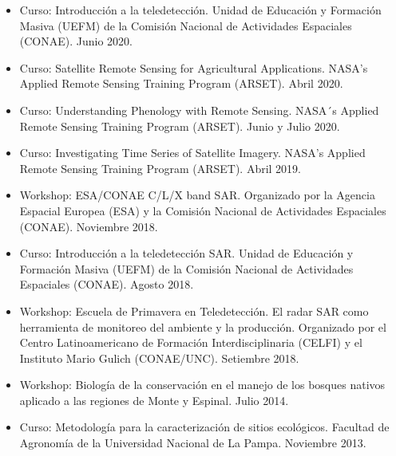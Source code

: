 \documentclass[9.5pt,a4paper,ragged2e, normalphoto]{altacv}
\begin{document}
\begin{itemize}
\item {Curso: Introducción a la teledetección. Unidad de Educación y Formación Masiva (UEFM) de la Comisión Nacional de Actividades Espaciales (CONAE). Junio 2020.}

\item {Curso: Satellite Remote Sensing for Agricultural Applications. NASA’s Applied Remote Sensing Training Program (ARSET). Abril 2020.}


\item {Curso: Understanding Phenology with Remote Sensing. NASA´s Applied Remote Sensing Training Program (ARSET). Junio y Julio 2020.}

\item {Curso: Investigating Time Series of Satellite Imagery. NASA’s Applied Remote Sensing Training Program (ARSET). Abril 2019.}

\item {Workshop: ESA/CONAE C/L/X band SAR. Organizado por la Agencia Espacial Europea (ESA) y la Comisión Nacional de Actividades Espaciales (CONAE). Noviembre 2018.} 

\item {Curso: Introducción a la teledetección SAR. Unidad de Educación y Formación Masiva (UEFM) de la Comisión Nacional de Actividades Espaciales (CONAE). Agosto 2018.}

\item {Workshop: Escuela de Primavera en Teledetección. El radar SAR como herramienta de monitoreo del ambiente y la producción. Organizado por el Centro Latinoamericano de Formación Interdisciplinaria (CELFI) y el Instituto Mario Gulich (CONAE/UNC). Setiembre 2018.}

\item {Workshop: Biología de la conservación en el manejo de los bosques nativos aplicado a las regiones de Monte y Espinal. Julio 2014.}

\item {Curso: Metodología para la caracterización de sitios ecológicos. Facultad de Agronomía de la Universidad Nacional de La Pampa. Noviembre 2013.}
\end{itemize}




 
 
  
  

\end{document}
